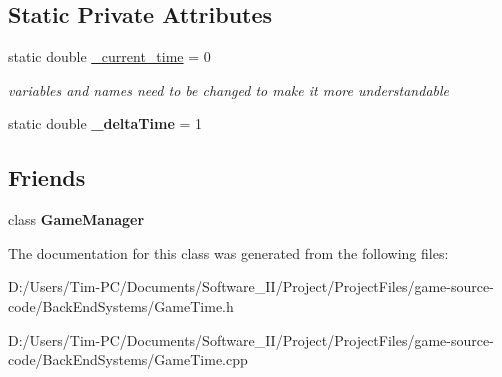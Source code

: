 \subsection*{Static Private Attributes}
\begin{DoxyCompactItemize}
\item 
\mbox{\label{class_game_time_a080d9deb72c675f0d68f9ad72eec66c3}} 
static double \hyperlink{class_game_time_a080d9deb72c675f0d68f9ad72eec66c3}{\+\_\+current\+\_\+time} = 0
\begin{DoxyCompactList}\small\item\em variables and names need to be changed to make it more understandable \end{DoxyCompactList}\item 
\mbox{\label{class_game_time_a39c7a52db277a99fd6dfcb457b432d7d}} 
static double {\bfseries \+\_\+delta\+Time} = 1
\end{DoxyCompactItemize}
\subsection*{Friends}
\begin{DoxyCompactItemize}
\item 
\mbox{\label{class_game_time_a140a2a29511147897abbb772733f6c2c}} 
class {\bfseries Game\+Manager}
\end{DoxyCompactItemize}


The documentation for this class was generated from the following files\+:\begin{DoxyCompactItemize}
\item 
D\+:/\+Users/\+Tim-\/\+P\+C/\+Documents/\+Software\+\_\+\+I\+I/\+Project/\+Project\+Files/game-\/source-\/code/\+Back\+End\+Systems/Game\+Time.\+h\item 
D\+:/\+Users/\+Tim-\/\+P\+C/\+Documents/\+Software\+\_\+\+I\+I/\+Project/\+Project\+Files/game-\/source-\/code/\+Back\+End\+Systems/Game\+Time.\+cpp\end{DoxyCompactItemize}
